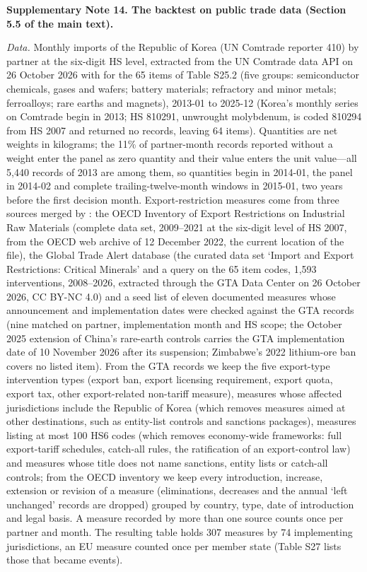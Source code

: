 \textbf{Supplementary Note 14. The backtest on public trade data (Section 5.5 of the main text).}

\textit{Data.} Monthly imports of the Republic of Korea (UN Comtrade reporter 410) by partner at the six-digit HS level, extracted from the UN Comtrade data API on 26 October 2026 with  for the 65 items of Table S25.2 (five groups: semiconductor chemicals, gases and wafers; battery materials; refractory and minor metals; ferroalloys; rare earths and magnets), 2013-01 to 2025-12 (Korea's monthly series on Comtrade begin in 2013; HS 810291, unwrought molybdenum, is coded 810294 from HS 2007 and returned no records, leaving 64 items). Quantities are net weights in kilograms; the 11\% of partner-month records reported without a weight enter the panel as zero quantity and their value enters the unit value---all 5,440 records of 2013 are among them, so quantities begin in 2014-01, the panel in 2014-02 and complete trailing-twelve-month windows in 2015-01, two years before the first decision month. Export-restriction measures come from three sources merged by : the OECD Inventory of Export Restrictions on Industrial Raw Materials (complete data set, 2009--2021 at the six-digit level of HS 2007, from the OECD web archive of 12 December 2022, the current location of the file), the Global Trade Alert database (the curated data set `Import and Export Restrictions: Critical Minerals' and a query on the 65 item codes, 1,593 interventions, 2008--2026, extracted through the GTA Data Center on 26 October 2026, CC BY-NC 4.0) and a seed list of eleven documented measures whose announcement and implementation dates were checked against the GTA records (nine matched on partner, implementation month and HS scope; the October 2025 extension of China's rare-earth controls carries the GTA implementation date of 10 November 2026 after its suspension; Zimbabwe's 2022 lithium-ore ban covers no listed item). From the GTA records we keep the five export-type intervention types (export ban, export licensing requirement, export quota, export tax, other export-related non-tariff measure), measures whose affected jurisdictions include the Republic of Korea (which removes measures aimed at other destinations, such as entity-list controls and sanctions packages), measures listing at most 100 HS6 codes (which removes economy-wide frameworks: full export-tariff schedules, catch-all rules, the ratification of an export-control law) and measures whose title does not name sanctions, entity lists or catch-all controls; from the OECD inventory we keep every introduction, increase, extension or revision of a measure (eliminations, decreases and the annual `left unchanged' records are dropped) grouped by country, type, date of introduction and legal basis. A measure recorded by more than one source counts once per partner and month. The resulting table holds 307 measures by 74 implementing jurisdictions, an EU measure counted once per member state (Table S27 lists those that became events).

